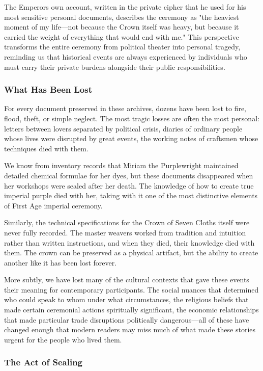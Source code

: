 The Emperor\textquotesingle s own account, written in the private cipher
that he used for his most sensitive personal documents, describes the
ceremony as "the heaviest moment of my life---not because the Crown
itself was heavy, but because it carried the weight of everything that
would end with me." This perspective transforms the entire ceremony from
political theater into personal tragedy, reminding us that historical
events are always experienced by individuals who must carry their
private burdens alongside their public responsibilities.

\subsubsection{What Has Been Lost}\label{what-has-been-lost}

For every document preserved in these archives, dozens have been lost to
fire, flood, theft, or simple neglect. The most tragic losses are often
the most personal: letters between lovers separated by political crisis,
diaries of ordinary people whose lives were disrupted by great events,
the working notes of craftsmen whose techniques died with them.

We know from inventory records that Miriam the Purplewright maintained
detailed chemical formulae for her dyes, but these documents disappeared
when her workshops were sealed after her death. The knowledge of how to
create true imperial purple died with her, taking with it one of the
most distinctive elements of First Age imperial ceremony.

Similarly, the technical specifications for the Crown of Seven Cloths
itself were never fully recorded. The master weavers worked from
tradition and intuition rather than written instructions, and when they
died, their knowledge died with them. The crown can be preserved as a
physical artifact, but the ability to create another like it has been
lost forever.

More subtly, we have lost many of the cultural contexts that gave these
events their meaning for contemporary participants. The social nuances
that determined who could speak to whom under what circumstances, the
religious beliefs that made certain ceremonial actions spiritually
significant, the economic relationships that made particular trade
disruptions politically dangerous---all of these have changed enough
that modern readers may miss much of what made these stories urgent for
the people who lived them.

\subsubsection{The Act of Sealing}\label{the-act-of-sealing}

